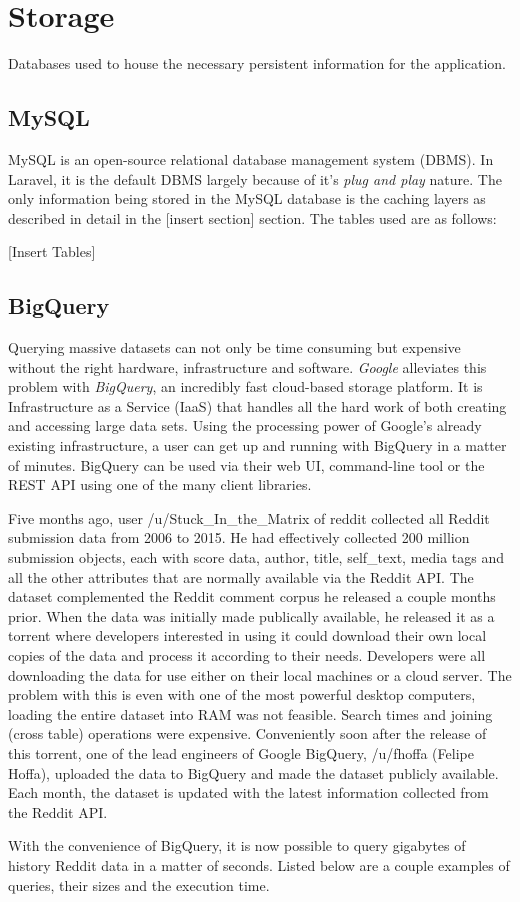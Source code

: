 \documentclass[msc,oneside]{ubcthesis}%
\begin{document}
\section{Storage}
Databases used to house the necessary persistent information for the application.

\subsection{MySQL}
MySQL is an open-source relational database management system (DBMS). In Laravel, it is the default DBMS largely because of it's \textit{plug and play} nature. The only information being stored in the MySQL database is the caching layers as described in detail in the [insert section] section. The tables used are as follows:

[Insert Tables]

\subsection{BigQuery}
Querying massive datasets can not only be time consuming but expensive without the right hardware, infrastructure and software. \textit{Google} alleviates this problem with \textit{BigQuery}, an incredibly fast cloud-based storage platform. It is Infrastructure as a Service (IaaS) that handles all the hard work of both creating and accessing large data sets. Using the processing power of Google's already existing infrastructure, a user can get up and running with BigQuery in a matter of minutes. BigQuery can be used via their web UI, command-line tool or the REST API using one of the many client libraries. 
\par
Five months ago, user /u/Stuck{\_}In{\_}the{\_}Matrix of reddit collected all Reddit submission data from 2006 to 2015. He had effectively collected 200 million submission objects, each with score data, author, title, self{\_}text, media tags and all the other attributes that are normally available via the Reddit API. The dataset complemented the Reddit comment corpus he released a couple months prior. When the data was initially made publically available, he released it as a torrent where developers interested in using it could download their own local copies of the data and process it according to their needs. Developers were all downloading the data for use either on their local machines or a cloud server. The problem with this is even with one of the most powerful desktop computers, loading the entire dataset into RAM was not feasible. Search times and joining (cross table) operations were expensive. Conveniently soon after the release of this torrent, one of the lead engineers of Google BigQuery, /u/fhoffa (Felipe Hoffa), uploaded the data to BigQuery and made the dataset publicly available. Each month, the dataset is updated with the latest information collected from the Reddit API.
\par
With the convenience of BigQuery, it is now possible to query gigabytes of history Reddit data in a matter of seconds. Listed below are a couple examples of queries, their sizes and the execution time.
\end{document}
